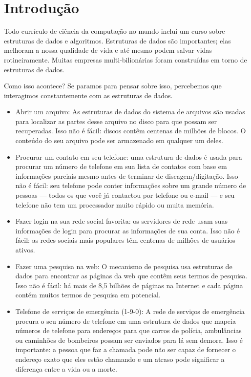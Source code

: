 \chapter{Introdução}

Todo currículo de ciência da computação no mundo inclui um curso sobre
estruturas de dados e algoritmos. Estruturas de dados são importantes; elas
melhoram a nossa qualidade de vida e até mesmo podem salvar vidas
rotineiramente. Muitas empresas multi-bilionárias foram construídas em torno de
estruturas de dados.

Como isso acontece? Se paramos para pensar sobre isso, percebemos que
interagimos constantemente com as estruturas de dados.
\begin{itemize}
	\item  Abrir um arquivo: As estruturas de dados do sistema de arquivos 
	são usadas para localizar as partes desse arquivo no disco para que possam ser
	recuperadas. Isso não é fácil: discos contêm centenas de milhões de blocos. O
	conteúdo do seu arquivo pode ser armazenado em qualquer um deles. 
	\item Procurar um contato em seu telefone: uma estrutura de dados é usada para
	procurar um número de telefone em sua lista de contatos 
	com base em informações parciais mesmo antes de terminar de discagem/digitação. 
	Isso não é fácil: seu telefone pode conter informações sobre um
	grande número de pessoas --- todos os que você já contactou por telefone ou
	e-mail --- e seu telefone não tem um processador muito rápido ou muita memória.
	\item Fazer login na sua rede social 
	favorita: os servidores de rede usam suas informações de login para procurar as
	informações de sua conta. Isso não é fácil: as redes sociais mais populares têm
	centenas de milhões de usuários ativos.
	\item Fazer uma pesquisa na web:
	O mecanismo de pesquisa usa estruturas de dados para encontrar as páginas da
	web que contêm seus termos de pesquisa. Isso não é fácil: há mais de 8,5 bilhões
	de páginas na Internet e cada página contém muitos termos de pesquisa em
	potencial.
	\item Telefone de serviços de emergência (1-9-0): 
	A rede de serviços de emergência procura o seu número de telefone em uma
	estrutura de dados que mapeia números de telefone para endereços para que carros
	de polícia, ambulâncias ou caminhões de bombeiros possam ser enviados para lá sem
	demora. Isso é importante: a pessoa que faz a chamada pode não ser capaz de
	fornecer o endereço exato que eles estão chamando e um atraso pode significar a
	diferença entre a vida ou a morte.
\end{itemize}


